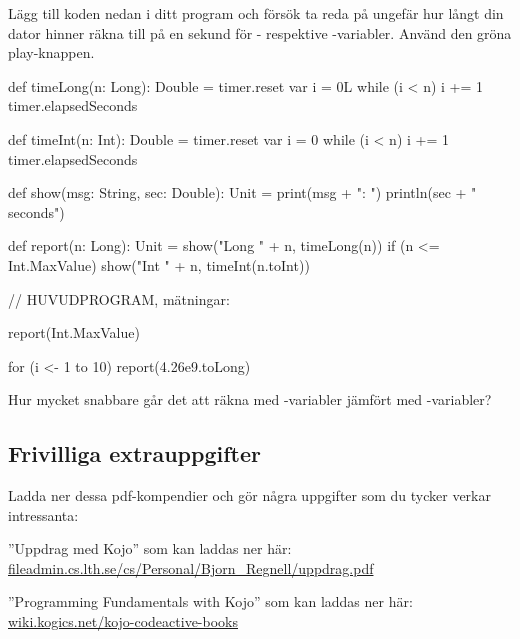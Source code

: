 \Subtask Lägg till koden nedan i ditt program och försök ta reda på ungefär hur långt din dator hinner räkna till på en sekund för - respektive -variabler. Använd den gröna play-knappen.
\begin{Code}
def timeLong(n: Long): Double = {
  timer.reset
  var i = 0L
  while (i < n) { i += 1 }
  timer.elapsedSeconds
}

def timeInt(n: Int): Double = {
  timer.reset
  var i = 0
  while (i < n) { i += 1 }
  timer.elapsedSeconds
}

def show(msg: String, sec: Double): Unit = {
  print(msg + ": ")
  println(sec + " seconds")
}

def report(n: Long): Unit = {
  show("Long " + n, timeLong(n))
  if (n <= Int.MaxValue) show("Int  " + n, timeInt(n.toInt))
}

// HUVUDPROGRAM, mätningar:

report(Int.MaxValue)

for (i <- 1 to 10) {
  report(4.26e9.toLong)
}
\end{Code}

\Subtask Hur mycket snabbare går det att räkna med -variabler jämfört med -variabler?

 


\subsection{Frivilliga extrauppgifter}

\Task Ladda ner dessa pdf-kompendier och gör några uppgifter som du tycker verkar intressanta:

\Subtask ''Uppdrag med Kojo'' som kan laddas ner här:\\ \href{http://fileadmin.cs.lth.se/cs/Personal/Bjorn_Regnell/uppdrag.pdf}{fileadmin.cs.lth.se/cs/Personal/Bjorn\_Regnell/uppdrag.pdf}

\Subtask ''Programming Fundamentals with Kojo'' som kan laddas ner här:\\
 \href{http://wiki.kogics.net/kojo-codeactive-books}{wiki.kogics.net/kojo-codeactive-books}

